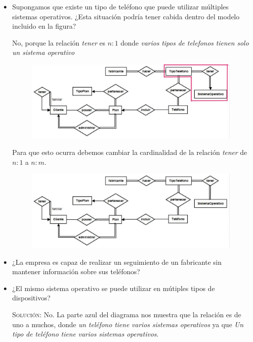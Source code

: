 \documentclass[letterpaper,11pt]{article}
\begin{document}
\begin{itemize}
    \item Supongamos que existe un tipo de teléfono que puede utilizar múltiples
    sistemas operativos. ¿Esta situación podría tener cabida dentro del modelo 
    incluido en la figura?

    No, porque la relación \textit{tener} es $n:1$ donde \textit{varios tipos de 
    telefonos tienen solo un sistema operativo}

    \begin{figure}[H]
        \centering
        \includegraphics[scale=0.4]{./imagenes/modelo7a.jpg}
    \end{figure}

    Para que esto ocurra debemos cambiar la cardinalidad de la relación 
    \textit{tener} de $n:1$ a $n:m$.
    \begin{figure}[H]
        \centering
        \includegraphics[scale=0.4]{./imagenes/modelo7b.jpg}
    \end{figure}

    \item ¿La empresa es capaz de realizar un seguimiento de un fabricante sin 
    mantener información sobre sus teléfonos?

    \item ¿El mismo sistema operativo se puede utilizar en mútiples tipos de  
    dispositivos? 

    \textsc{Solución:} No. La parte azul del diagrama nos muestra que la 
    relación es de uno a muchos, donde \textit{un teléfono tiene varios 
    sistemas operativos} ya que \textit{Un tipo de teléfono tiene varios 
    sistemas operativos}. 


\end{itemize}
\end{document}
